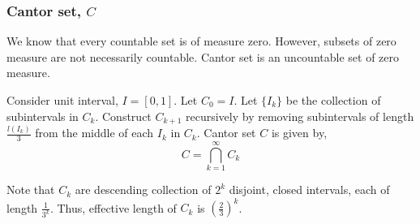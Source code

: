 \subsubsection{Cantor set, $C$}
	We know that every countable set is of measure zero. However, subsets of zero measure are not necessarily countable. Cantor set is an uncountable set of zero measure.

\begin{definition}
	Consider unit interval, $I = [0,1]$.
	Let $C_0 = I$.
	Let $\{ I_k \}$ be the collection of subintervals in $C_k$.
	Construct $C_{k+1}$ recursively by removing subintervals of length $\frac{l(I_k)}{3}$ from the middle of each $I_k$ in $C_k$.
	Cantor set $C$ is given by, 
	\begin{equation}
		C = \bigcap_{k = 1}^\infty C_k
		\label{eq:cantorset}
	\end{equation}
\end{definition}
	Note that $C_k$ are descending collection of $2^k$ disjoint, closed intervals, each of length $\frac{1}{3^k}$.
	Thus, effective length of $C_k$ is $(\frac{2}{3})^k$.

